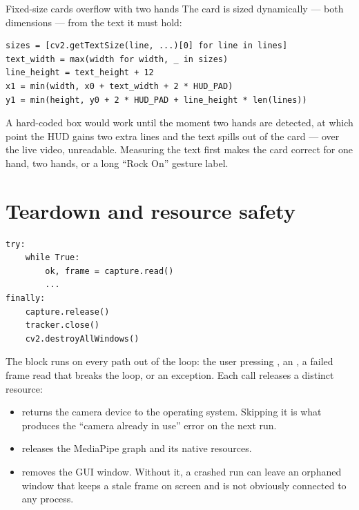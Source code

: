 \begin{edgetrap}{Fixed-size cards overflow with two hands}
The card is sized dynamically --- both dimensions --- from the text it must hold:

\begin{lstlisting}
sizes = [cv2.getTextSize(line, ...)[0] for line in lines]
text_width = max(width for width, _ in sizes)
line_height = text_height + 12
x1 = min(width, x0 + text_width + 2 * HUD_PAD)
y1 = min(height, y0 + 2 * HUD_PAD + line_height * len(lines))
\end{lstlisting}

A hard-coded box would work until the moment two hands are detected, at which point the HUD gains two
extra lines and the text spills out of the card --- over the live video, unreadable. Measuring the
text first makes the card correct for one hand, two hands, or a long ``Rock On'' gesture label.
\end{edgetrap}

\section{Teardown and resource safety}
\label{sec:teardown}

\begin{codecard}
\begin{lstlisting}
try:
    while True:
        ok, frame = capture.read()
        ...
finally:
    capture.release()
    tracker.close()
    cv2.destroyAllWindows()
\end{lstlisting}
\end{codecard}

The  block runs on every path out of the loop: the user pressing , an
, a failed frame read that breaks the loop, or an exception. Each call releases a distinct
resource:

\begin{itemize}
  \item {} returns the camera device to the operating system. Skipping it is
        what produces the ``camera already in use'' error on the next run.
  \item {} releases the MediaPipe graph and its native resources.
  \item {} removes the GUI window. Without it, a crashed run can leave an
        orphaned window that keeps a stale frame on screen and is not obviously connected to any
        process.
\end{itemize}

